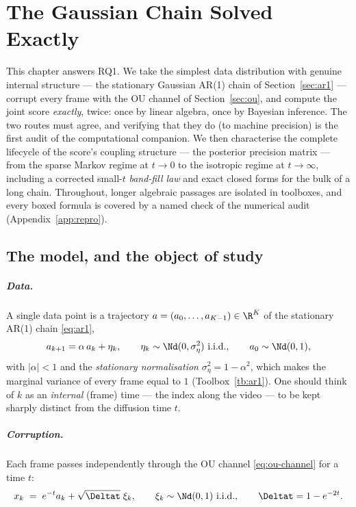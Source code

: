 \chapter{The Gaussian Chain Solved Exactly}\label{ch:gaussian}

This chapter answers RQ1. We take the simplest data distribution with
genuine internal structure --- the stationary Gaussian AR(1) chain of
Section~\ref{sec:ar1} --- corrupt every frame with the OU channel of
Section~\ref{sec:ou}, and compute the joint score \emph{exactly}, twice: once
by linear algebra, once by Bayesian inference. The two routes must agree, and
verifying that they do (to machine precision) is the first audit of the
computational companion. We then characterise the complete lifecycle of the
score's coupling structure --- the posterior precision matrix --- from the
sparse Markov regime at $t \to 0$ to the isotropic regime at $t \to \infty$,
including a corrected small-$t$ \emph{band-fill law} and exact closed forms
for the bulk of a long chain. Throughout, longer algebraic passages are
isolated in toolboxes, and every boxed formula is covered by a named check of
the numerical audit (Appendix~\ref{app:repro}).

\section{The model, and the object of study}\label{sec:g-model}

\paragraph{Data.} A single data point is a trajectory
$a = (a_0, \dots, a_{K-1}) \in \R^K$ of the stationary AR(1) chain
\eqref{eq:ar1},
\begin{equation}
  a_{k+1} = \alpha\, a_k + \eta_k,
  \qquad \eta_k \sim \Nd(0, \sigma_\eta^2)\ \text{i.i.d.},
  \qquad a_0 \sim \Nd(0, 1),
  \label{eq:g-ar1}
\end{equation}
with $|\alpha| < 1$ and the \emph{stationary normalisation}
$\sigma_\eta^2 = 1 - \alpha^2$, which makes the marginal variance of every
frame equal to $1$ (Toolbox~\ref{tb:ar1}). One should think of $k$ as an
\emph{internal} (frame) time --- the index along the video --- to be kept
sharply distinct from the diffusion time $t$.

\paragraph{Corruption.} Each frame passes independently through the OU
channel \eqref{eq:ou-channel} for a time $t$:
\begin{equation}
  x_k \;=\; e^{-t} a_k + \sqrt{\Deltat}\;\xi_k,
  \qquad \xi_k \sim \Nd(0,1)\ \text{i.i.d.},
  \qquad \Deltat = 1 - e^{-2t}.
  \label{eq:g-channel}
\end{equation}

